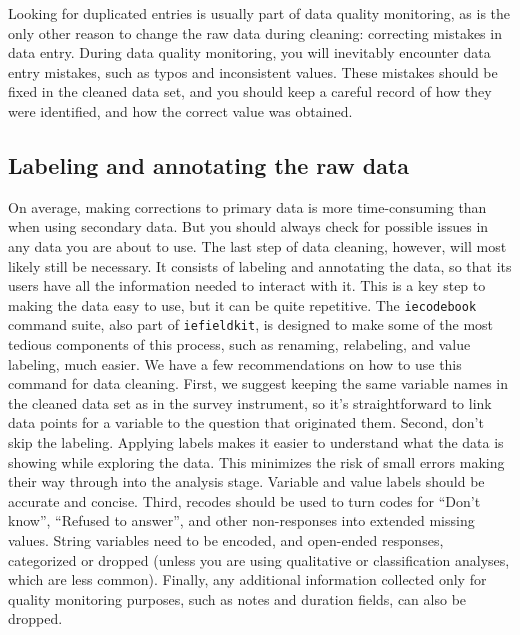 Looking for duplicated entries is usually part of data quality monitoring,
as is the only other reason to change the raw data during cleaning:
correcting mistakes in data entry.
During data quality monitoring, you will inevitably encounter data entry mistakes,
such as typos and inconsistent values.
These mistakes should be fixed in the cleaned data set,
and you should keep a careful record of how they were identified,
and how the correct value was obtained.

\subsection{Labeling and annotating the raw data}

On average, making corrections to primary data is more time-consuming than when using secondary data.
But you should always check for possible issues in any data you are about to use.
The last step of data cleaning, however, will most likely still be necessary.
It consists of labeling and annotating the data, so that its users have all the 
information needed to interact with it.
This is a key step to making the data easy to use, but it can be quite repetitive.
The \texttt{iecodebook} command suite, also part of \texttt{iefieldkit},
is designed to make some of the most tedious components of this process,
such as renaming, relabeling, and value labeling, much easier.
We have a few recommendations on how to use this command for data cleaning.
First, we suggest keeping the same variable names in the cleaned data set as in the survey instrument, so it's straightforward to link data points for a variable to the question that originated them.
Second, don't skip the labeling.
Applying labels makes it easier to understand what the data is showing while exploring the data. 
This minimizes the risk of small errors making their way through into the analysis stage.
Variable and value labels should be accurate and concise.
Third, recodes should be used to turn codes for ``Don't know'', ``Refused to answer'', and
other non-responses into extended missing values.
String variables need to be encoded, and open-ended responses, categorized or dropped
(unless you are using qualitative or classification analyses, which are less common).
Finally, any additional information collected only for quality monitoring purposes,
such as notes and duration fields, can also be dropped.


